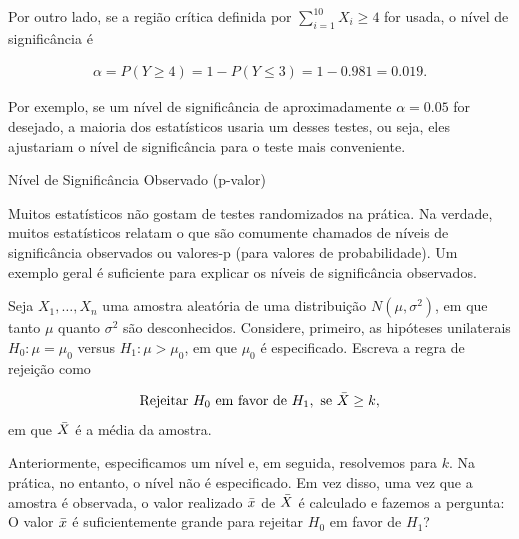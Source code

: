 \documentclass[12pt]{beamer}
\begin{document}
\begin{frame}{}
	\begin{block}{}
		\justifying
		Por outro lado, se a região crítica definida por $\sum_{i=1}^{10} X_i \geq 4$ for usada, o nível de significância é
		
		\begin{align*}
			\alpha = P(Y \geq 4) = 1 - P(Y \leq 3) = 1 - 0.981 = 0.019.
		\end{align*}
		
		Por exemplo, se um nível de significância de aproximadamente $\alpha = 0.05$ for desejado, a maioria dos estatísticos usaria um desses testes, ou seja, eles ajustariam o nível de significância para o teste mais conveniente. 
	\end{block}
\end{frame}

\begin{frame}{Nível de Significância Observado (p-valor)}
\begin{block}{}
\justifying
Muitos estatísticos não gostam de testes randomizados na prática. %
Na verdade, muitos estatísticos relatam o que são comumente chamados de níveis de significância observados ou valores-p (para valores de probabilidade). Um exemplo geral é suficiente para explicar os níveis de significância observados.  
\end{block}
\end{frame}

\begin{frame}{}
\begin{block}{}
\justifying
Seja $X_1, \ldots, X_n$ uma amostra aleatória de uma distribuição $N(\mu, \sigma^2)$, em que tanto $\mu$ quanto $\sigma^2$ são desconhecidos. Considere, primeiro, as hipóteses unilaterais $H_0 : \mu = \mu_0$ versus $H_1 : \mu > \mu_0$, em que $\mu_0$ é especificado. Escreva a regra de rejeição como

\begin{align}
\text{Rejeitar } H_0 \text{ em favor de } H_1, \text{ se } \Bar{X} \geq k, 
\end{align}
em que $\Bar{X}$ é a média da amostra.
\end{block}
\pause
\begin{block}{}
\justifying
Anteriormente, especificamos um nível e, em seguida, resolvemos para $k$. Na prática, no entanto, o nível não é especificado. Em vez disso, uma vez que a amostra é observada, o valor realizado $\Bar{x}$ de $\Bar{X}$ é calculado e fazemos a pergunta: O valor $\Bar{x}$ é suficientemente grande para rejeitar $H_0$ em favor de $H_1$? 
\end{block}
\end{frame}
\end{document}
